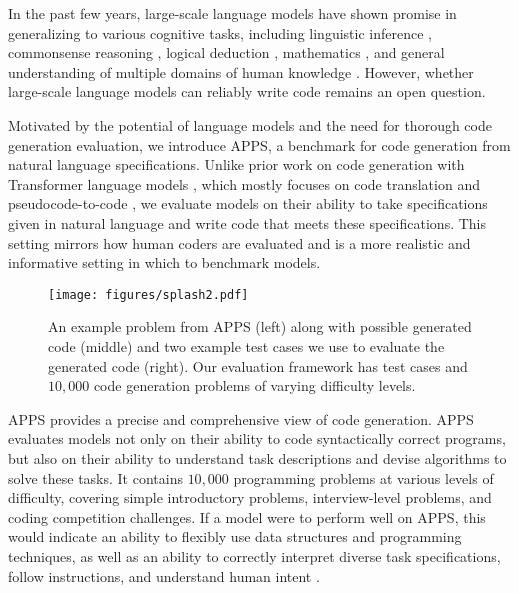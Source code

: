 \documentclass{article}
\begin{document}
In the past few years, large-scale language models have shown promise in generalizing to various cognitive tasks, including linguistic inference \citep{NEURIPS2019_4496bf24}, commonsense reasoning \citep{zellers2019hellaswag,huang2019cosmosqa,bisk2019physicaliqa}, logical deduction \citep{Liu2020LogiQAAC}, mathematics \citep{Polu2020GenerativeLM,hendrycksmath2021}, and general understanding of multiple domains of human knowledge \citep{hendryckstest2021}. However, whether large-scale language models can reliably write code remains an open question. 

Motivated by the potential of language models and the need for thorough code generation evaluation, we introduce APPS, a benchmark for code generation from natural language specifications. Unlike prior work on code generation with Transformer language models \citep{Vaswani2017AttentionIA}, which mostly focuses on code translation \citep{lachaux2020unsupervised} and pseudocode-to-code \citep{NEURIPS2019_7298332f}, we evaluate models on their ability to take specifications given in natural language and write code that meets these specifications. This setting mirrors how human coders are evaluated and is a more realistic and informative setting in which to benchmark models.

\begin{figure*}[t]
    \centering
    \texttt{[image: figures/splash2.pdf]}
    \caption{An example problem from APPS (left) along with possible generated code (middle) and two example test cases we use to evaluate the generated code (right). Our evaluation framework has test cases and $10,\!000$ code generation problems of varying difficulty levels.}
    \label{fig:apps_splash}
\end{figure*}

APPS provides a precise and comprehensive view of code generation. APPS evaluates models not only on their ability to code syntactically correct programs, but also on their ability to understand task descriptions and devise algorithms to solve these tasks. It contains $10,\!000$ programming problems at various levels of difficulty, covering simple introductory problems, interview-level problems, and coding competition challenges. If a model were to perform well on APPS, this would indicate an ability to flexibly use data structures and programming techniques, as well as an ability to correctly interpret diverse task specifications, follow instructions, and understand human intent \citep{hendrycks2021ethics}.
\end{document}
